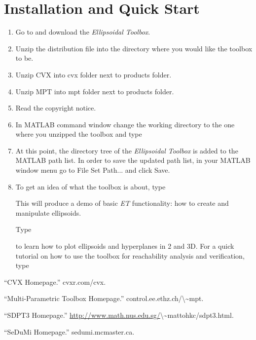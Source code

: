 \documentclass[letterpaper,10pt,english]{sphinxmanual}
\begin{document}
\section{Installation and Quick Start}
\label{chap_install:installation-and-quick-start}\begin{enumerate}
\item {} 
Go to and download the \emph{Ellipsoidal Toolbox}.

\item {} 
Unzip the distribution file into the directory where you would like
the toolbox to be.

\item {} 
Unzip CVX into cvx folder next to products folder.

\item {} 
Unzip MPT into mpt folder next to products folder.

\item {} 
Read the copyright notice.

\item {} 
In MATLAB command window change the working directory to the one
where you unzipped the toolbox and type

\item {} 
At this point, the directory tree of the \emph{Ellipsoidal Toolbox} is
added to the MATLAB path list. In order to save the updated path
list, in your MATLAB window menu go to File \rightarrow Set
Path... and click Save.

\item {} 
To get an idea of what the toolbox is about, type

This will produce a demo of basic \emph{ET} functionality: how to create
and manipulate ellipsoids.

Type

to learn how to plot ellipsoids and hyperplanes in 2 and 3D. For a
quick tutorial on how to use the toolbox for reachability analysis
and verification, type

\end{enumerate}

“CVX Homepage.” cvxr.com/cvx.

“Multi-Parametric Toolbox Homepage.” control.ee.ethz.ch/\textbackslash{}\textasciitilde{}mpt.

“SDPT3 Homepage.” \href{http://www.math.nus.edu.sg/}{http://www.math.nus.edu.sg/}\textbackslash{}\textasciitilde{}mattohkc/sdpt3.html.

“SeDuMi Homepage.” sedumi.mcmaster.ca.
\end{document}
